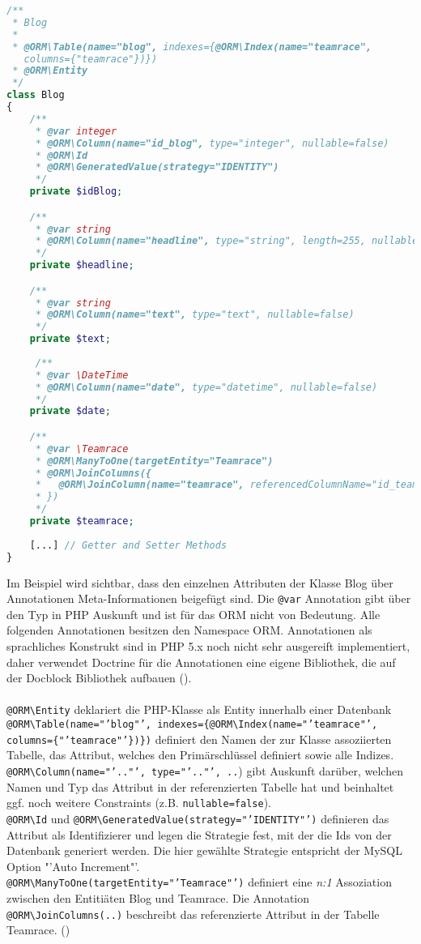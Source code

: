 \documentclass[12pt]{report}
\begin{document}
\begin{lstlisting}[language=PHP, caption=Auszug aus src/TeamRace/WebBundle/Entity/Blog.php]
/**
 * Blog
 *
 * @ORM\Table(name="blog", indexes={@ORM\Index(name="teamrace", 
   columns={"teamrace"})})
 * @ORM\Entity
 */
class Blog
{
    /**
     * @var integer
     * @ORM\Column(name="id_blog", type="integer", nullable=false)
     * @ORM\Id
     * @ORM\GeneratedValue(strategy="IDENTITY")
     */
    private $idBlog;

    /**
     * @var string
     * @ORM\Column(name="headline", type="string", length=255, nullable=false)
     */
    private $headline;

    /**
     * @var string
     * @ORM\Column(name="text", type="text", nullable=false)
     */
    private $text;
    
     /**
     * @var \DateTime
     * @ORM\Column(name="date", type="datetime", nullable=false)
     */
    private $date;

    /**
     * @var \Teamrace
     * @ORM\ManyToOne(targetEntity="Teamrace")
     * @ORM\JoinColumns({
     *   @ORM\JoinColumn(name="teamrace", referencedColumnName="id_teamrace")
     * })
     */
    private $teamrace;
    
    [...] // Getter and Setter Methods
}
\end{lstlisting}
Im Beispiel wird sichtbar, dass den einzelnen Attributen der Klasse Blog über Annotationen Meta-Informationen beigefügt sind. Die \texttt{@var} Annotation gibt über den Typ in PHP Auskunft und ist für das ORM nicht von Bedeutung. Alle folgenden Annotationen besitzen den Namespace ORM. Annotationen als sprachliches Konstrukt sind in PHP 5.x noch nicht sehr ausgereift implementiert, daher verwendet Doctrine für die Annotationen eine eigene Bibliothek, die auf der Docblock Bibliothek aufbauen (\cite{Doctrine:BasicMapping}).\\\\ 
\texttt{@ORM\textbackslash Entity} deklariert die PHP-Klasse als Entity innerhalb einer Datenbank\\
\texttt{@ORM\textbackslash Table(name="'blog"', indexes=\{@ORM\textbackslash Index(name="'teamrace"', columns=\{"'teamrace"'\})\})} 
definiert den Namen der zur Klasse assoziierten Tabelle, das Attribut, welches den Primärschlüssel definiert sowie alle Indizes.\\
\texttt{@ORM\textbackslash Column(name="'.."', type="'.."', ..}) gibt Auskunft darüber, welchen Namen und Typ das Attribut in der referenzierten Tabelle hat und beinhaltet ggf. noch weitere Constraints (z.B. \texttt{nullable=false}).\\
\texttt{@ORM\textbackslash Id} und \texttt{@ORM\textbackslash GeneratedValue(strategy="'IDENTITY"')} definieren das Attribut als Identifizierer und legen die Strategie fest, mit der die Ids von der Datenbank generiert werden. Die hier gewählte Strategie entspricht der MySQL Option "'Auto Increment"'.\\
\texttt{@ORM\textbackslash ManyToOne(targetEntity="'Teamrace"')} definiert eine \emph{n:1} Assoziation zwischen den Entitiäten Blog und Teamrace. Die Annotation \texttt{@ORM\textbackslash JoinColumns(..)} beschreibt das referenzierte Attribut in der Tabelle Teamrace. (\cite{Doctrine:Associations})
\end{document}
